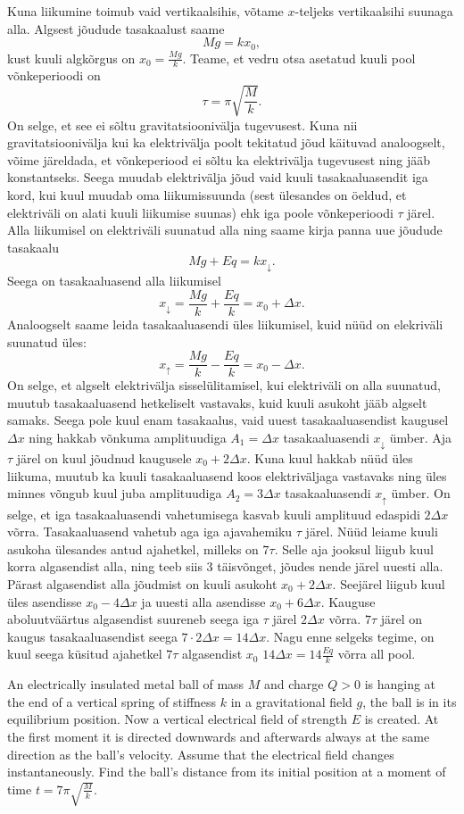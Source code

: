 \solu
Kuna liikumine toimub vaid vertikaalsihis, võtame $x$-teljeks vertikaalsihi suunaga alla. Algsest jõudude tasakaalust saame
$$Mg = kx_0,$$
kust kuuli algkõrgus on $x_0 = \frac{Mg}{k}$. Teame, et vedru otsa asetatud kuuli pool võnkeperioodi on 
$$\tau = \pi \sqrt{\frac{M}{k}}.$$
On selge, et see ei sõltu gravitatsioonivälja tugevusest. Kuna nii gravitatsioonivälja kui ka elektrivälja poolt tekitatud jõud käituvad analoogselt, võime järeldada, et võnkeperiood ei sõltu ka elektrivälja tugevusest ning jääb konstantseks. Seega muudab elektrivälja jõud vaid kuuli tasakaaluasendit iga kord, kui kuul muudab oma liikumissuunda (sest ülesandes on öeldud, et elektriväli on alati kuuli liikumise suunas) ehk iga poole võnkeperioodi $\tau$ järel. Alla liikumisel on elektriväli suunatud alla ning saame kirja panna uue jõudude tasakaalu
$$Mg + Eq = kx_\downarrow.$$
Seega on tasakaaluasend alla liikumisel
$$x_\downarrow = \frac{Mg}{k} + \frac{Eq}{k} = x_0 + \Delta x.$$
Analoogselt saame leida tasakaaluasendi üles liikumisel, kuid nüüd on elekriväli suunatud üles:
$$x_\uparrow = \frac{Mg}{k} - \frac{Eq}{k} = x_0 - \Delta x.$$
On selge, et algselt elektrivälja sisselülitamisel, kui elektriväli on alla suunatud, muutub tasakaaluasend hetkeliselt vastavaks, kuid kuuli asukoht jääb algselt samaks. Seega pole kuul enam tasakaalus, vaid uuest tasakaaluasendist kaugusel $\Delta x$ ning hakkab võnkuma amplituudiga $A_1 = \Delta x$ tasakaaluasendi $x_\downarrow$ ümber. Aja $\tau$ järel on kuul jõudnud kaugusele $x_0 + 2\Delta x$. Kuna kuul hakkab nüüd üles liikuma, muutub ka kuuli tasakaaluasend koos elektriväljaga vastavaks ning üles minnes võngub kuul juba amplituudiga $A_2 = 3 \Delta x$ tasakaaluasendi $x_\uparrow$ ümber.
On selge, et iga tasakaaluasendi vahetumisega kasvab kuuli amplituud edaspidi $2 \Delta x$ võrra. Tasakaaluasend vahetub aga iga ajavahemiku $\tau$ järel.
Nüüd leiame kuuli asukoha ülesandes antud ajahetkel, milleks on $7 \tau$. Selle aja jooksul liigub kuul korra algasendist alla, ning teeb siis $3$ täisvõnget, jõudes nende järel uuesti alla. Pärast algasendist alla jõudmist on kuuli asukoht $x_0 + 2 \Delta x $. Seejärel liigub kuul üles asendisse $x_0 - 4 \Delta x$ ja uuesti alla asendisse $x_0 + 6 \Delta x$. Kauguse aboluutväärtus algasendist suureneb seega iga $\tau$ järel $2 \Delta x$ võrra. $7 \tau$ järel on kaugus tasakaaluasendist seega $7 \cdot 2 \Delta x = 14 \Delta x$.
Nagu enne selgeks tegime, on kuul seega küsitud ajahetkel $7 \tau$ algasendist $x_0$ $14 \Delta x = 14 \frac{Eq}{k}$ võrra all pool.

An electrically insulated metal ball of mass $M$ and charge $Q>0$ is hanging at the end of a vertical spring of stiffness $k$ in a gravitational field $g$, the ball is in its equilibrium position. Now a vertical electrical field of strength $E$ is created. At the first moment it is directed downwards and afterwards always at the same direction as the ball’s velocity. Assume that the electrical field changes instantaneously. Find the ball’s distance from its initial position at a moment of time $t=7\pi \sqrt{\frac{M}{k}}$.

